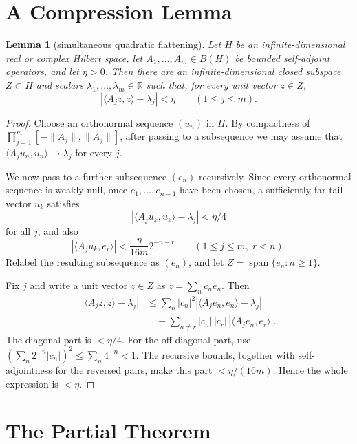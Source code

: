 \documentclass[11pt]{article}
\newtheorem{lemma}{Lemma}
\newcommand{\Span}{\operatorname{span}}
\begin{document}
\section*{A Compression Lemma}

\begin{lemma}[simultaneous quadratic flattening]\label{lem:flatten}
Let \(H\) be an infinite-dimensional real or complex Hilbert space, let
\(A_1,\ldots,A_m\in B(H)\) be bounded self-adjoint operators, and let
\(\eta>0\).  Then there are an infinite-dimensional closed subspace \(Z\subset H\)
and scalars \(\lambda_1,\ldots,\lambda_m\in\mathbb{R}\) such that, for every
unit vector \(z\in Z\),
\[
  \left|\langle A_j z,z\rangle-\lambda_j\right|<\eta
  \qquad (1\leq j\leq m).
\]
\end{lemma}

\begin{proof}
Choose an orthonormal sequence \((u_n)\) in \(H\).  By compactness of
\(\prod_{j=1}^m[-\|A_j\|,\|A_j\|]\), after passing to a subsequence we may
assume that \(\langle A_j u_n,u_n\rangle\to\lambda_j\) for every \(j\).

We now pass to a further subsequence \((e_n)\) recursively.  Since every
orthonormal sequence is weakly null, once \(e_1,\ldots,e_{n-1}\) have been
chosen, a sufficiently far tail vector \(u_k\) satisfies
\[
  |\langle A_j u_k,u_k\rangle-\lambda_j|<\eta/4
\]
for all \(j\), and also
\[
  |\langle A_j u_k,e_r\rangle|
     < \frac{\eta}{16m}2^{-n-r}
     \qquad (1\leq j\leq m,\; r<n).
\]
Relabel the resulting subsequence as \((e_n)\), and let
\(Z=\overline{\Span}\{e_n:n\geq1\}\).

Fix \(j\) and write a unit vector \(z\in Z\) as \(z=\sum_n c_n e_n\).  Then
\[
\begin{aligned}
\left|\langle A_jz,z\rangle-\lambda_j\right|
&\leq
\sum_n |c_n|^2
   \left|\langle A_j e_n,e_n\rangle-\lambda_j\right|  \\
&\quad+
\sum_{n\neq r}|c_n|\,|c_r|\,|\langle A_j e_n,e_r\rangle|.
\end{aligned}
\]
The diagonal part is \(<\eta/4\).  For the off-diagonal part, use
\((\sum_n2^{-n}|c_n|)^2\leq\sum_n4^{-n}<1\).  The recursive bounds, together
with self-adjointness for the reversed pairs, make this part \(<\eta/(16m)\).
Hence the whole expression is \(<\eta\).
\end{proof}

\section*{The Partial Theorem}
\end{document}
